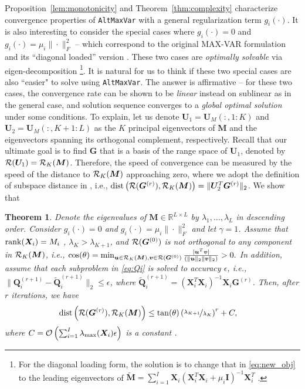 \documentclass[10pt,journal]{IEEEtran}
\newtheorem{Theorem}{Theorem}
\newcommand{\G}{\boldsymbol{G}}
\newcommand{\Q}{\boldsymbol{Q}}
\newcommand{\X}{\boldsymbol{X}}
\begin{document}
Proposition~\ref{lem:monotonicity} and Theorem~\ref{thm:complexity} characterize convergence properties of \texttt{AltMaxVar} with a general regularization term $g_i(\cdot)$.
It is also interesting to consider the special cases where $g_i(\cdot)=0$ and $g_i(\cdot)=\mu_i\|\cdot\|_F^2$ -- which correspond to the original MAX-VAR formulation and its ``diagonal loaded'' version \cite{rastogimultiview}.
These two cases are \emph{optimally solvable} via eigen-decomposition \footnote{For the diagonal loading form, the solution is to change that in \eqref{eq:new_obj} to the leading eigenvectors of $\tilde{\bm M}=\sum_{i=1}^{I}{\bm X}_i({\bm X}_i^T{\bm X}_i+\mu_i{\bm I})^{-1}{\bm X}_i^T$ \cite{rastogimultiview}.}. 
It is natural for us to think if these two special cases are also ``easier" to solve using \texttt{AltMaxVar}.
The answer is affirmative -- for these two cases,
the convergence rate can be shown to be \emph{linear} instead on sublinear as in the general case, and solution sequence converges to a \emph{global optimal solution} under some conditions.
To explain, let us denote ${\bm U}_1= {\bm U}_M(:,1:K)$ and ${\bm U}_2={\bm U}_M(:,K+1:L)$ as the $K$ principal eigenvectors of ${\bm M}$ and the eigenvectors spanning its orthogonal complement, respectively.
Recall that our ultimate goal is to find ${\bm G}$ that is a basis of the range space of ${\bm U}_1$, denoted by ${\cal R}({\bm U}_1)={\cal R}_K({\bm M})$.
Therefore, the speed of convergence can be measured by the speed of the distance to
${\cal R}_K({\bm M})$ approaching zero, where we adopt 
the definition of subspace distance in \cite{GHGolub1996}, i.e.,
${\rm dist}\left({\cal R}({\bm G}^{(r)}),{\cal R}_K({\bm M})\right) =\|{\bm U}_2^T{\bm G}^{(r)}\|_2$. We show that
\begin{Theorem} \label{thm:main}
   Denote the eigenvalues of ${\bm M}\in\mathbb{R}^{L\times L}$ by $\lambda_1,\ldots,\lambda_L$ in descending order. 
   Consider $g_i(\cdot)=0$ and $g_i(\cdot)=\mu_i\|\cdot\|_F^2$ and let $\gamma = 1$.
   Assume that ${\rm rank}({\bm X}_i)=M_i$ , $\lambda_K>\lambda_{K+1}$, and ${\cal R}({\bm G}^{(0)})$ is not orthogonal to any component in ${\cal R}_K({\bm M})$, i.e., 
  $\cos(\theta) = \min_{{\bm u}\in{\cal R}_K({\bm M}), {\bm v}\in{\cal R}({\bm G}^{(0)})}\frac{|{\bm u}^T{\bm v}|}{(\|{\bm u}\|_2\|{\bm v}\|_2)}>0.$
   In addition, assume that each subproblem in \eqref{eq:Qi} is solved to accuracy $\epsilon$, i.e.,
   $\|\Q_i^{(r+1)}-\tilde{\Q}_i^{(r+1)}\|_2 \leq \epsilon$, where $\tilde{\Q}_i^{(r+1)}=(\X_i^T\X_i)^{-1}\X_i\G^{(r)}$.
   Then,  after $r$ iterations, we have
   \begin{align*}
      &{\rm dist}\left({\cal R}({\bm G}^{(r)}),{\cal R}_K({\bm M})\right)\leq \tan(\theta)\left(\nicefrac{\lambda_{K+1}}{\lambda_K}\right)^r + C,
   \end{align*}
   where $C={\cal O}\left(\sum_{i=1}^I\lambda_{\max}(\X_i)\epsilon\right)$ is a constant .
\end{Theorem}
\end{document}
